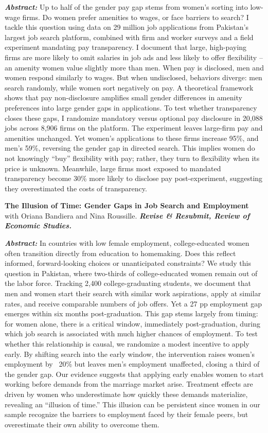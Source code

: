 \documentclass[10.5pt]{article}
\newcommand{\paperabstract}[1]{%
  \vspace{.15cm}%
  \begin{list}{}{%
    \setlength{\leftmargin}{1.4em}%
    \setlength{\rightmargin}{0em}%
    \setlength{\topsep}{0pt}%
    \setlength{\partopsep}{0pt}%
    \setlength{\itemsep}{0pt}%
    \setlength{\parsep}{0pt}%
  }%
  \item[] {\small\textbf{\textit{Abstract:}} #1}%
  \end{list}%
  \vspace{.4cm}%
}
\begin{document}
\paperabstract{Up to half of the gender pay gap stems from women's sorting into low-wage firms. Do women prefer amenities to wages, or face barriers to search? I tackle this question using data on 29 million job applications from Pakistan's largest job search platform, combined with firm and worker surveys and a field experiment mandating pay transparency. I document that large, high-paying firms are more likely to omit salaries in job ads and less likely to offer flexibility – an amenity women value slightly more than men. When pay is disclosed, men and women respond similarly to wages. But when undisclosed, behaviors diverge: men search randomly, while women sort negatively on pay. A theoretical framework shows that pay non-disclosure amplifies small gender differences in amenity preferences into large gender gaps in applications. To test whether transparency closes these gaps, I randomize mandatory versus optional pay disclosure in 20,088 jobs across 8,906 firms on the platform. The experiment leaves large-firm pay and amenities unchanged. Yet women's applications to these firms increase 95\%, and men's 59\%, reversing the gender gap in directed search.  This implies women do not knowingly ``buy'' flexibility with pay; rather, they turn to flexibility when its price is unknown. Meanwhile, large firms most exposed to mandated transparency become 30\% more likely to disclose pay post-experiment, suggesting they overestimated the costs of transparency.}


\textbf{{The Illusion of Time: Gender Gaps in Job Search and Employment}} \vspace*{.1cm} \\with Oriana Bandiera and Nina Roussille. \textbf{\textit{Revise \& Resubmit, Review of Economic Studies.}}

\paperabstract{In countries with low female employment, college-educated women often transition directly from education to homemaking. Does this reflect informed, forward-looking choices or unanticipated constraints? We study this question in Pakistan, where two-thirds of college-educated women remain out of the labor force. Tracking 2,400 college-graduating students, we document that men and women start their search with similar work aspirations, apply at similar rates, and receive comparable numbers of job offers. Yet a 27 pp employment gap emerges within six months post-graduation. This gap stems largely from timing: for women alone, there is a critical window, immediately post-graduation, during which job search is associated with much higher chances of employment. To test whether this relationship is causal, we randomize a modest incentive to apply early. By shifting search into the early window, the intervention raises women's employment by ~20\% but leaves men's employment unaffected, closing a third of the gender gap. Our evidence suggests that applying early enables women to start working before demands from the marriage market arise. Treatment effects are driven by women who underestimate how quickly these demands materialize, revealing an ``illusion of time.'' This illusion can be persistent since women in our sample recognize the barriers to employment faced by their female peers, but overestimate their own ability to overcome them.}
\end{document}
